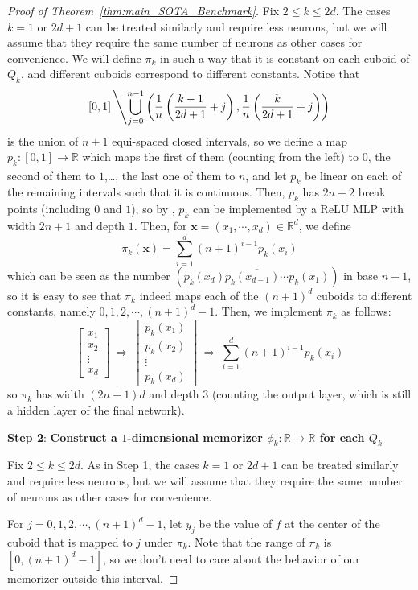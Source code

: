 \documentclass{article}
\numberwithin{equation}{section}
\theoremstyle{definition}
\begin{document}
\begin{proof}[{Proof of Theorem~\ref{thm:main_SOTA_Benchmark}}]
Fix $2\le k\le 2d$. The cases $k=1$ or $2d+1$ can be treated similarly and require less neurons, but we will assume that they require the same number of neurons as other cases for convenience. We will define $\pi_k$ in such a way that it is constant on each cuboid of $Q_k$, and different cuboids correspond to different constants. Notice that
$$[0,1] \left\backslash 
\bigcup_{j=0}^{n-1} \left(
\frac{1}{n} \left( \frac{k-1}{2d+1}+j \right) , 
\frac{1}{n} \left( \frac{k}{2d+1}+j \right) 
\right)
\right.$$
is the union of $n+1$ equi-spaced closed intervals, so we define a map $p_k:[0,1] \xrightarrow[]{} \mathbb{R}$ which maps the first of them (counting from the left) to $0$, the second of them to $1$,\dots, the last one of them to $n$, and let $p_k$ be linear on each of the remaining intervals such that it is continuous. Then, $p_k$ has $2n+2$ break points (including $0$ and $1$), so by \citep[Lemma 2.1]{shen2019nonlinear}, $p_k$ can be implemented by a ReLU MLP with width $2n+1$ and depth $1$. Then, for $\mathbf{x}=(x_1,\cdots,x_d)\in\mathbb{R}^d$, we define
$$\pi_k(\mathbf{x})=\sum_{i=1}^d (n+1)^{i-1}p_k(x_i)$$
which can be seen as the number $(\overline{p_k(x_d)p_k(x_{d-1})\cdots p_k(x_1)})$ in base $n+1$, so it is easy to see that $\pi_k$ indeed maps each of the $(n+1)^d$ cuboids to different constants, namely $0,1,2,\cdots,(n+1)^d-1$. Then, we implement $\pi_k$ as follows:
$$\begin{bmatrix} x_1 \\ x_2 \\ \vdots \\ x_d \end{bmatrix}
\ \Longrightarrow \
\begin{bmatrix} p_k(x_1) \\ p_k(x_2) \\ \vdots \\ p_k(x_d) \end{bmatrix}
\ \Longrightarrow \
\sum_{i=1}^d (n+1)^{i-1}p_k(x_i)$$
so $\pi_k$ has width $(2n+1)d$ and depth $3$ (counting the output layer, which is still a hidden layer of the final network).

\textbf{Step 2}: \textbf{
Construct a $1$-dimensional memorizer $\phi_k:\mathbb{R} \rightarrow \mathbb{R}$ for each $Q_k$
}

Fix $2\le k\le 2d$. As in Step 1, the cases $k=1$ or $2d+1$ can be treated similarly and require less neurons, but we will assume that they require the same number of neurons as other cases for convenience.

For $j=0,1,2,\cdots,(n+1)^d-1$, let $y_j$ be the value of $f$ at the center of the cuboid that is mapped to $j$ under $\pi_k$. Note that the range of $\pi_k$ is $[0,(n+1)^d-1]$, so we don't need to care about the behavior of our memorizer outside this interval.


\end{proof}
\end{document}
